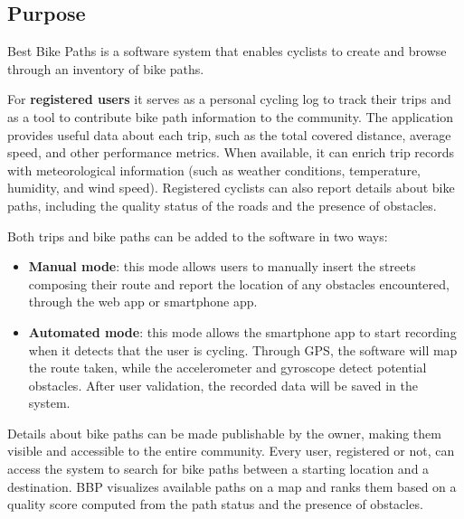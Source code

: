\subsection{Purpose}
Best Bike Paths is a software system that enables cyclists to create and browse through an inventory of bike paths.

\noindent For \textbf{registered users} it serves as a personal cycling log to track their trips and as a tool to contribute bike path information to the community. The application provides useful data about each trip, such as the total covered distance, average speed, and other performance metrics. When available, it can enrich trip records with meteorological information (such as weather conditions, temperature, humidity, and wind speed).
Registered cyclists can also report details about bike paths, including the quality status of the roads and the presence of obstacles.

\noindent Both trips and bike paths can be added to the software in two ways:
\begin{itemize}
    \item[] \textbf{Manual mode}: this mode allows users to manually insert the streets composing their route and report the location of any obstacles encountered, through the web app or smartphone app.
    \item[] \textbf{Automated mode}: this mode allows the smartphone app to start recording when it detects that the user is cycling. Through GPS, the software will map the route taken, while the accelerometer and gyroscope detect potential obstacles. After user validation, the recorded data will be saved in the system. 
\end{itemize}
\noindent Details about bike paths can be made publishable by the owner, making them visible and accessible to the entire community.
Every user, registered or not, can access the system to search for bike paths between a starting location and a destination. BBP visualizes available paths on a map and ranks them based on a quality score computed from the path status and the presence of obstacles.

